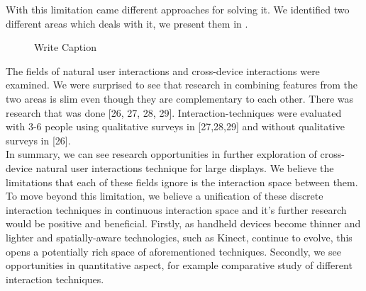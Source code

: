 With this limitation came different approaches for solving it. 
We identified two different areas which deals with it, we present them in . 

\begin{figure}[h!]
\centering
{}
\caption{Write Caption}
\label{fig:litreview}
\end{figure}
The fields of natural user interactions and cross-device interactions were examined. 
We were surprised to see that research in combining features from the two areas is slim even though they are complementary to each other. 
There was research that was done [26, 27, 28, 29]. 
Interaction-techniques were evaluated with 3-6 people using qualitative surveys in [27,28,29] and without qualitative surveys in [26].\\

In summary, we can see research opportunities in further exploration of cross-device natural user interactions technique for large displays. We believe the limitations that each of these fields ignore is the interaction space between them. To move beyond this limitation, we believe a unification of these discrete interaction techniques in continuous interaction space and it's further research would be positive and beneficial.
Firstly, as handheld devices become thinner and lighter and spatially-aware technologies, such as Kinect, continue to evolve, this opens a potentially rich space of aforementioned techniques. 
Secondly, we see opportunities in quantitative aspect, for example comparative study of different interaction techniques. 
